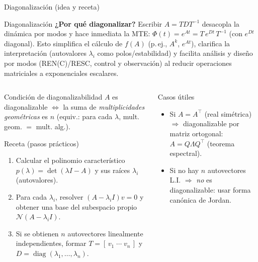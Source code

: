 \documentclass[
    10pt,
    aspectratio=169,
    xcolor={dvipsnames},
    spanish,
    ]{beamer}
\begin{document}
\begin{frame}{Diagonalización (idea y receta)}
\footnotesize
\begin{block}{Diagonalización}
  \noindent\textbf{¿Por qué diagonalizar?}
Escribir $A=TDT^{-1}$ desacopla la dinámica por modos y hace inmediata la MTE:
$\Phi(t)=e^{At}=T\,e^{Dt}\,T^{-1}$ (con $e^{Dt}$ diagonal). Esto simplifica el cálculo de
$f(A)$ (p.\,ej., $A^k$, $e^{At}$), clarifica la interpretación (autovalores $\lambda_i$ como polos/estabilidad)
y facilita análisis y diseño por modos (REN(C)/RESC, control y observación) al reducir operaciones
matriciales a exponenciales escalares.

\end{block}
\begin{columns}
  \begin{column}{0.52\textwidth}

    \begin{block}{Condición de diagonalizabilidad}
      $A$ es diagonalizable $\Longleftrightarrow$ la suma de \emph{multiplicidades geométricas} es $n$ (equiv.: para cada $\lambda$, mult. geom. $=$ mult. alg.).
    \end{block}
    \begin{block}{Receta (pasos prácticos)}
    \begin{enumerate}\itemsep2pt
      \item Calcular el polinomio característico $p(\lambda)=\det(\lambda I-A)$ y sus raíces $\lambda_i$ (autovalores).
      \item Para cada $\lambda_i$, resolver $(A-\lambda_i I)v=0$ y obtener una base del subespacio propio $\mathcal N(A-\lambda_i I)$.
      \item Si se obtienen $n$ autovectores linealmente independientes, formar $T=[\,v_1\;\cdots\;v_n\,]$ y $D=\operatorname{diag}(\lambda_1,\dots,\lambda_n)$.
    \end{enumerate}
    \end{block}

  \end{column}

  \begin{column}{0.46\textwidth}
  
    \begin{block}{Casos útiles}
    \begin{itemize}\itemsep2pt
      \item Si $A=A^\top$ (real simétrica) $\Rightarrow$ diagonalizable por matriz ortogonal: $A=Q\Lambda Q^\top$ (teorema espectral).
      \item Si no hay $n$ autovectores L.I. $\Rightarrow$ \emph{no} es diagonalizable: usar forma canónica de Jordan.
    \end{itemize}
    \end{block}


\end{column}
\end{columns}
\end{frame}
\end{document}
